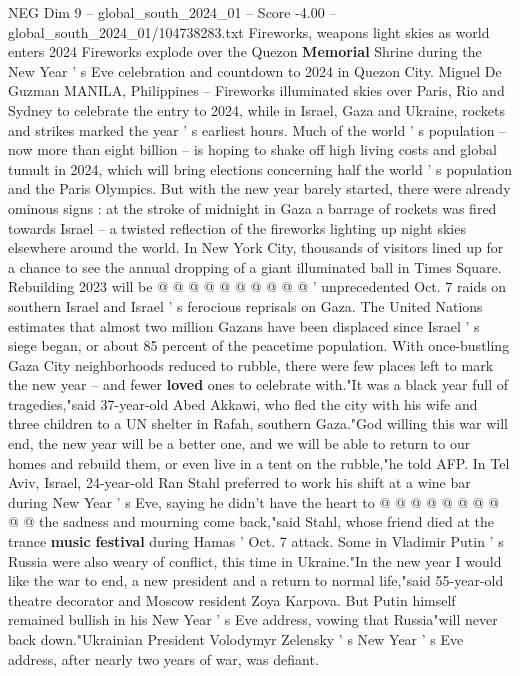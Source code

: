 \begin{textsample}{NEG Dim 9 – global\_south\_2024\_01 – Score -4.00 – global\_south\_2024\_01/104738283.txt}  \label{ex:f9_neg_429}
Fireworks, weapons light skies as world enters 2024 Fireworks explode over the Quezon \textbf{Memorial} Shrine during the New Year ' s Eve celebration and countdown to 2024 in Quezon City.
Miguel De Guzman MANILA, Philippines -- Fireworks illuminated skies over Paris, Rio and Sydney to celebrate the entry to 2024, while in Israel, Gaza and Ukraine, rockets and strikes marked the year ' s earliest hours.
Much of the world ' s population -- now more than eight billion -- is hoping to shake off high living costs and global tumult in 2024, which will bring elections concerning half the world ' s population and the Paris Olympics.
But with the new year barely started, there were already ominous signs : at the stroke of midnight in Gaza a barrage of rockets was fired towards Israel -- a twisted reflection of the fireworks lighting up night skies elsewhere around the world.
In New York City, thousands of visitors lined up for a chance to see the annual dropping of a giant illuminated ball in Times Square.
Rebuilding 2023 will be @ @ @ @ @ @ @ @ @ @ ' unprecedented Oct. 7 raids on southern Israel and Israel ' s ferocious reprisals on Gaza.
The United Nations estimates that almost two million Gazans have been displaced since Israel ' s siege began, or about 85 percent of the peacetime population.
With once-bustling Gaza City neighborhoods reduced to rubble, there were few places left to mark the new year -- and fewer \textbf{loved} ones to celebrate with."It was a black year full of tragedies,"said 37-year-old Abed Akkawi, who fled the city with his wife and three children to a UN shelter in Rafah, southern Gaza."God willing this war will end, the new year will be a better one, and we will be able to return to our homes and rebuild them, or even live in a tent on the rubble,"he told AFP.
In Tel Aviv, Israel, 24-year-old Ran Stahl preferred to work his shift at a wine bar during New Year ' s Eve, saying he didn't have the heart to @ @ @ @ @ @ @ @ @ @ the sadness and mourning come back,"said Stahl, whose friend died at the trance \textbf{music} \textbf{festival} during Hamas ' Oct. 7 attack.
Some in Vladimir Putin ' s Russia were also weary of conflict, this time in Ukraine."In the new year I would like the war to end, a new president and a return to normal life,"said 55-year-old theatre decorator and Moscow resident Zoya Karpova.
But Putin himself remained bullish in his New Year ' s Eve address, vowing that Russia"will never back down."Ukrainian President Volodymyr Zelensky ' s New Year ' s Eve address, after nearly two years of war, was defiant.

\end{textsample}
